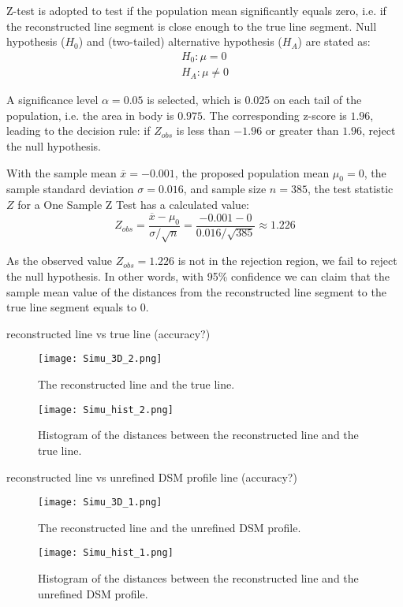 Z-test is adopted to test if the population mean significantly equals zero, i.e. if the reconstructed line segment is close enough to the true line segment. Null hypothesis ($H_0$) and (two-tailed) alternative hypothesis ($H_A$) are stated as:
\begin{equation}
\begin{split}
H_0: \mu=0\\
H_A: \mu\neq0
\end{split}
\end{equation}

A significance level $\alpha=0.05$ is selected, which is $0.025$ on each tail of the population, i.e. the area in body is $0.975$. The corresponding z-score is $1.96$, leading to the decision rule: if $Z_{obs}$ is less than $-1.96$ or greater than $1.96$, reject the null hypothesis.

With the sample mean $\overline{x}=-0.001$,
the proposed population mean $\mu_0=0$,
the sample standard deviation $\sigma=0.016$,
and sample size $n=385$, the test statistic $Z$ for a One Sample Z Test has a calculated value:
\begin{equation}
Z_{obs} = \frac{\overline{x} - \mu_0}{\sigma/\sqrt{n}}=\frac{-0.001-0}{0.016/\sqrt{385}}\approx1.226
\end{equation}

As the observed value $Z_{obs}=1.226$ is not in the rejection region, we fail to reject the null hypothesis. In other words, with 95\% confidence we can claim that the sample mean value of the distances from the reconstructed line segment to the true line segment equals to 0.


\clearpage
reconstructed line vs true line (accuracy?)

\begin{figure} [h!]
  \centering
  \texttt{[image: Simu\_3D\_2.png]} %
  \caption{\small The reconstructed line and the true line.}
  \label{fig:Simu3D_2}
  \vspace{1cm}
  \texttt{[image: Simu\_hist\_2.png]} %
  \caption{\small Histogram of the distances between the reconstructed line and the true line.}
  \label{fig:SimuHist_2}
\end{figure}





\clearpage
reconstructed line vs unrefined DSM profile line (accuracy?)
\begin{figure} [h!]
  \centering
  \texttt{[image: Simu\_3D\_1.png]} %
  \caption{\small The reconstructed line and the unrefined DSM profile.}
  \label{fig:Simu3D_1}
  \vspace{1cm}
  \texttt{[image: Simu\_hist\_1.png]} %
  \caption{\small Histogram of the distances between the reconstructed line and the unrefined DSM profile.}
  \label{fig:SimuHist_1}
\end{figure}

